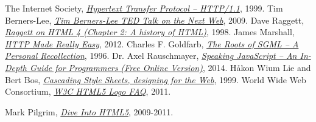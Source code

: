 
\begin{thebibliography}{99}

  The Internet Society,
  \emph{\href{http://tools.ietf.org/html/rfc2616}{Hypertext Transfer Protocol -- HTTP/1.1}},  
  1999.
  Tim Berners-Lee,
  \emph{\href{http://www.ted.com/talks/tim_berners_lee_on_the_next_web?language=en}{Tim Berners-Lee TED Talk on the Next Web}},  
  2009.
  Dave Raggett,
  \emph{\href{http://www.w3.org/People/Raggett/book4/ch02.html}{Raggett on HTML 4 (Chapter 2: A history of HTML)}},  
  1998.
  James Marshall,
  \emph{\href{http://www.jmarshall.com/easy/http/}{HTTP Made Really Easy}},  
  2012.
Charles F. Goldfarb,
\emph{\href{http://www.sgmlsource.com/history/roots.htm}{The Roots of SGML -- A Personal Recollection}},  
1996.
Dr. Axel Rauschmayer,
\emph{\href{http://speakingjs.com/es5/}{Speaking JavaScript -- An In-Depth Guide for Programmers (Free Online Version)}},  
2014.
Håkon Wium Lie and Bert Bos,
\emph{\href{http://www.w3.org/Style/LieBos2e/history/Overview.html}{Cascading Style Sheets, designing for the Web}},  
1999.
World Wide Web Consortium,
\emph{\href{http://www.w3.org/html/logo/faq.html}{W3C HTML5 Logo FAQ}},  
2011.




Mark Pilgrim,
\emph{\href{http://diveintohtml5.info/index.html}{Dive Into HTML5}},  
2009-2011.
\end{thebibliography}